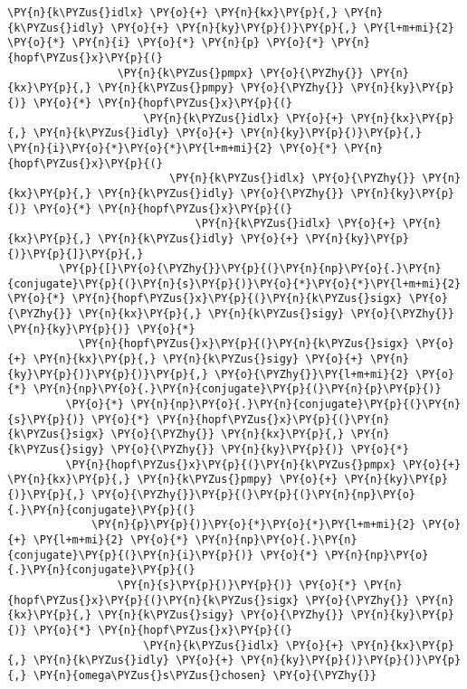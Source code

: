 \begin{Verbatim}[commandchars=\\\{\}]
             \PY{n}{k\PYZus{}idlx} \PY{o}{+} \PY{n}{kx}\PY{p}{,} \PY{n}{k\PYZus{}idly} \PY{o}{+} \PY{n}{ky}\PY{p}{)}\PY{p}{,} \PY{l+m+mi}{2} \PY{o}{*} \PY{n}{i} \PY{o}{*} \PY{n}{p} \PY{o}{*} \PY{n}{hopf\PYZus{}x}\PY{p}{(}
                 \PY{n}{k\PYZus{}pmpx} \PY{o}{\PYZhy{}} \PY{n}{kx}\PY{p}{,} \PY{n}{k\PYZus{}pmpy} \PY{o}{\PYZhy{}} \PY{n}{ky}\PY{p}{)} \PY{o}{*} \PY{n}{hopf\PYZus{}x}\PY{p}{(}
                     \PY{n}{k\PYZus{}idlx} \PY{o}{+} \PY{n}{kx}\PY{p}{,} \PY{n}{k\PYZus{}idly} \PY{o}{+} \PY{n}{ky}\PY{p}{)}\PY{p}{,} \PY{n}{i}\PY{o}{*}\PY{o}{*}\PY{l+m+mi}{2} \PY{o}{*} \PY{n}{hopf\PYZus{}x}\PY{p}{(}
                         \PY{n}{k\PYZus{}idlx} \PY{o}{\PYZhy{}} \PY{n}{kx}\PY{p}{,} \PY{n}{k\PYZus{}idly} \PY{o}{\PYZhy{}} \PY{n}{ky}\PY{p}{)} \PY{o}{*} \PY{n}{hopf\PYZus{}x}\PY{p}{(}
                             \PY{n}{k\PYZus{}idlx} \PY{o}{+} \PY{n}{kx}\PY{p}{,} \PY{n}{k\PYZus{}idly} \PY{o}{+} \PY{n}{ky}\PY{p}{)}\PY{p}{]}\PY{p}{,}
        \PY{p}{[}\PY{o}{\PYZhy{}}\PY{p}{(}\PY{n}{np}\PY{o}{.}\PY{n}{conjugate}\PY{p}{(}\PY{n}{s}\PY{p}{)}\PY{o}{*}\PY{o}{*}\PY{l+m+mi}{2} \PY{o}{*} \PY{n}{hopf\PYZus{}x}\PY{p}{(}\PY{n}{k\PYZus{}sigx} \PY{o}{\PYZhy{}} \PY{n}{kx}\PY{p}{,} \PY{n}{k\PYZus{}sigy} \PY{o}{\PYZhy{}} \PY{n}{ky}\PY{p}{)} \PY{o}{*}
           \PY{n}{hopf\PYZus{}x}\PY{p}{(}\PY{n}{k\PYZus{}sigx} \PY{o}{+} \PY{n}{kx}\PY{p}{,} \PY{n}{k\PYZus{}sigy} \PY{o}{+} \PY{n}{ky}\PY{p}{)}\PY{p}{)}\PY{p}{,} \PY{o}{\PYZhy{}}\PY{l+m+mi}{2} \PY{o}{*} \PY{n}{np}\PY{o}{.}\PY{n}{conjugate}\PY{p}{(}\PY{n}{p}\PY{p}{)}
         \PY{o}{*} \PY{n}{np}\PY{o}{.}\PY{n}{conjugate}\PY{p}{(}\PY{n}{s}\PY{p}{)} \PY{o}{*} \PY{n}{hopf\PYZus{}x}\PY{p}{(}\PY{n}{k\PYZus{}sigx} \PY{o}{\PYZhy{}} \PY{n}{kx}\PY{p}{,} \PY{n}{k\PYZus{}sigy} \PY{o}{\PYZhy{}} \PY{n}{ky}\PY{p}{)} \PY{o}{*}
         \PY{n}{hopf\PYZus{}x}\PY{p}{(}\PY{n}{k\PYZus{}pmpx} \PY{o}{+} \PY{n}{kx}\PY{p}{,} \PY{n}{k\PYZus{}pmpy} \PY{o}{+} \PY{n}{ky}\PY{p}{)}\PY{p}{,} \PY{o}{\PYZhy{}}\PY{p}{(}\PY{p}{(}\PY{n}{np}\PY{o}{.}\PY{n}{conjugate}\PY{p}{(}
             \PY{n}{p}\PY{p}{)}\PY{o}{*}\PY{o}{*}\PY{l+m+mi}{2} \PY{o}{+} \PY{l+m+mi}{2} \PY{o}{*} \PY{n}{np}\PY{o}{.}\PY{n}{conjugate}\PY{p}{(}\PY{n}{i}\PY{p}{)} \PY{o}{*} \PY{n}{np}\PY{o}{.}\PY{n}{conjugate}\PY{p}{(}
                 \PY{n}{s}\PY{p}{)}\PY{p}{)} \PY{o}{*} \PY{n}{hopf\PYZus{}x}\PY{p}{(}\PY{n}{k\PYZus{}sigx} \PY{o}{\PYZhy{}} \PY{n}{kx}\PY{p}{,} \PY{n}{k\PYZus{}sigy} \PY{o}{\PYZhy{}} \PY{n}{ky}\PY{p}{)} \PY{o}{*} \PY{n}{hopf\PYZus{}x}\PY{p}{(}
                     \PY{n}{k\PYZus{}idlx} \PY{o}{+} \PY{n}{kx}\PY{p}{,} \PY{n}{k\PYZus{}idly} \PY{o}{+} \PY{n}{ky}\PY{p}{)}\PY{p}{)}\PY{p}{,} \PY{n}{omega\PYZus{}s\PYZus{}chosen} \PY{o}{\PYZhy{}}

\end{Verbatim}

